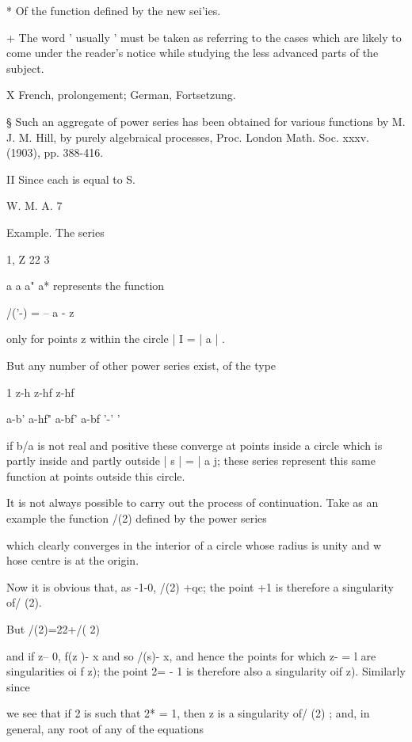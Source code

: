 {{* Of the function defined by the new sei'ies.

+ The word ' usually ' must be taken as referring to the cases which
are likely to come under the reader's notice while studying the less
advanced parts of the subject.

X French, prolongement; German, Fortsetzung.

§ Such an aggregate of power series has been obtained for various
functions by M. J. M. Hill, by purely algebraical processes, Proc.
London Math. Soc. xxxv. (1903), pp. 388-416.

II Since each is equal to S.

W. M. A. 7

%
%

Example. The series

1, Z 22 3

a a a" a* represents the function

/('-) = -- a - z

only for points z within the circle | I = | a | .

But any number of other power series exist, of the type

1 z-h z-hf z-hf

a-b' a-hf" a-bf' a-bf '-' '

if b/a is not real and positive these converge at points inside a
circle which is partly inside and partly outside | s | = | a j; these
series represent this same function at points outside this circle.


It is not always possible to carry out the process of continuation.
Take as an example the function /(2) defined by the power series

which clearly converges in the interior of a circle whose radius is
unity and w hose centre is at the origin.

Now it is obvious that, as -1-0, /(2) +qc; the point +1 is therefore
a singularity of/ (2).

But /(2)=22+/( 2)

and if z-- 0, f(z )- x and so /(s)- x, and hence the points for which
z- = l are singularities oi f z); the point 2= - 1 is therefore also
a singularity oif z). Similarly since

we see that if 2 is such that 2* = 1, then z is a singularity of/ (2)
; and, in general, any root of any of the equations

}}
